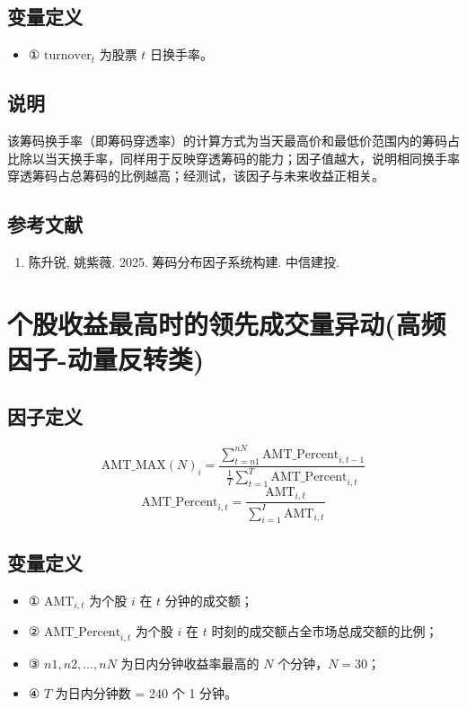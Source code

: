 \documentclass{article}
\begin{document}
\subsection{变量定义}
\begin{itemize}
    \item ① \( \mathrm{turnover}_t \) 为股票 \( t \) 日换手率。
\end{itemize}

\subsection{说明}
该筹码换手率（即筹码穿透率）的计算方式为当天最高价和最低价范围内的筹码占比除以当天换手率，同样用于反映穿透筹码的能力；因子值越大，说明相同换手率穿透筹码占总筹码的比例越高；经测试，该因子与未来收益正相关。

\subsection{参考文献}
\begin{enumerate}
    \item 陈升锐, 姚紫薇. 2025. 筹码分布因子系统构建. 中信建投.
\end{enumerate}

\section{个股收益最高时的领先成交量异动(高频因子-动量反转类)}

\subsection{因子定义}

\begin{equation}
    \mathrm{AMT\_MAX}(N)_i = \frac{\sum_{t=n1}^{nN} \mathrm{AMT\_Percent}_{i,t-1}}{\frac{1}{T}\sum_{t=1}^{T} \mathrm{AMT\_Percent}_{i,t}}
\end{equation}
\begin{equation}
    \mathrm{AMT\_Percent}_{i,t} = \frac{\mathrm{AMT}_{i,t}}{\sum_{i=1}^{I} \mathrm{AMT}_{i,t}}
\end{equation}

\subsection{变量定义}
\begin{itemize}
    \item ① \( \mathrm{AMT}_{i,t} \) 为个股 \( i \) 在 \( t \) 分钟的成交额；
    \item ② \( \mathrm{AMT\_Percent}_{i,t} \) 为个股 \( i \) 在 \( t \) 时刻的成交额占全市场总成交额的比例；
    \item ③ \( n1, n2, \ldots, nN \) 为日内分钟收益率最高的 \( N \) 个分钟，\( N=30 \)；
    \item ④ \( T \) 为日内分钟数 = 240 个 1 分钟。
\end{itemize}
\end{document}
